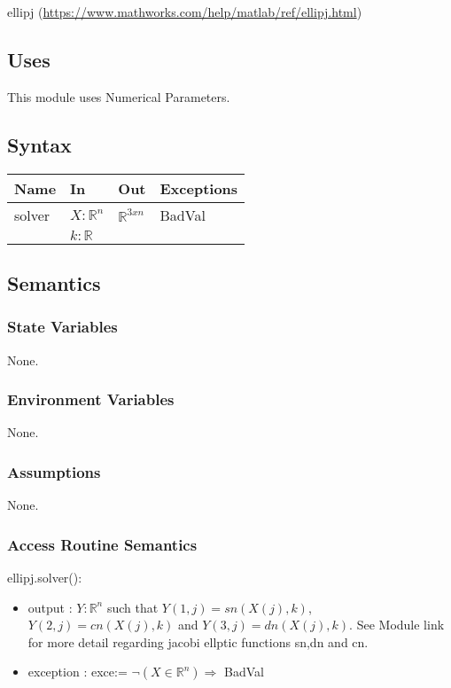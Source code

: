 \documentclass[12pt, titlepage]{article}
\begin{document}
ellipj (\url{https://www.mathworks.com/help/matlab/ref/ellipj.html})

\subsection{Uses}

This module uses Numerical Parameters. 

\subsection{Syntax}

\begin{center}
	\begin{tabular}{p{2cm} p{6cm} p{6cm} p{3cm}}
		\hline
		\textbf{Name} & \textbf{In} & \textbf{Out} & \textbf{Exceptions} \\
		\hline
		solver & $X : \mathbb{R}^{n}$ & $\mathbb{R}^{3xn}$ & 
		BadVal \\ 
		 & $k : \mathbb{R}$ &  &  \\ 
		\hline
	\end{tabular}
\end{center}

\subsection{Semantics}

\subsubsection{State Variables}

None.

\subsubsection{Environment Variables}

None.

\subsubsection{Assumptions}

None.

\subsubsection{Access Routine Semantics}

\noindent ellipj.solver():
\begin{itemize}
	\item output : $Y: \mathbb{R}^{n}$ such that $Y(1,j)= sn(X(j),k)$, 
	$Y(2,j)=cn(X(j),k)$ and $Y(3,j)=dn(X(j),k)$. See Module link for more 
	detail regarding jacobi ellptic functions sn,dn and cn. 
	\item exception : exce:= $\neg(X \in \mathbb{R}^{n}) \Rightarrow$ 
	BadVal
\end{itemize}
\end{document}
